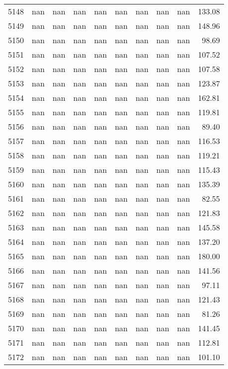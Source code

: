 \begin{tabular}{lrrrrrrrrr}
5148 & nan & nan & nan & nan & nan & nan & nan & nan & 133.08 \\
5149 & nan & nan & nan & nan & nan & nan & nan & nan & 148.96 \\
5150 & nan & nan & nan & nan & nan & nan & nan & nan & 98.69 \\
5151 & nan & nan & nan & nan & nan & nan & nan & nan & 107.52 \\
5152 & nan & nan & nan & nan & nan & nan & nan & nan & 107.58 \\
5153 & nan & nan & nan & nan & nan & nan & nan & nan & 123.87 \\
5154 & nan & nan & nan & nan & nan & nan & nan & nan & 162.81 \\
5155 & nan & nan & nan & nan & nan & nan & nan & nan & 119.81 \\
5156 & nan & nan & nan & nan & nan & nan & nan & nan & 89.40 \\
5157 & nan & nan & nan & nan & nan & nan & nan & nan & 116.53 \\
5158 & nan & nan & nan & nan & nan & nan & nan & nan & 119.21 \\
5159 & nan & nan & nan & nan & nan & nan & nan & nan & 115.43 \\
5160 & nan & nan & nan & nan & nan & nan & nan & nan & 135.39 \\
5161 & nan & nan & nan & nan & nan & nan & nan & nan & 82.55 \\
5162 & nan & nan & nan & nan & nan & nan & nan & nan & 121.83 \\
5163 & nan & nan & nan & nan & nan & nan & nan & nan & 145.58 \\
5164 & nan & nan & nan & nan & nan & nan & nan & nan & 137.20 \\
5165 & nan & nan & nan & nan & nan & nan & nan & nan & 180.00 \\
5166 & nan & nan & nan & nan & nan & nan & nan & nan & 141.56 \\
5167 & nan & nan & nan & nan & nan & nan & nan & nan & 97.11 \\
5168 & nan & nan & nan & nan & nan & nan & nan & nan & 121.43 \\
5169 & nan & nan & nan & nan & nan & nan & nan & nan & 81.26 \\
5170 & nan & nan & nan & nan & nan & nan & nan & nan & 141.45 \\
5171 & nan & nan & nan & nan & nan & nan & nan & nan & 112.81 \\
5172 & nan & nan & nan & nan & nan & nan & nan & nan & 101.10 \\

\end{tabular}
